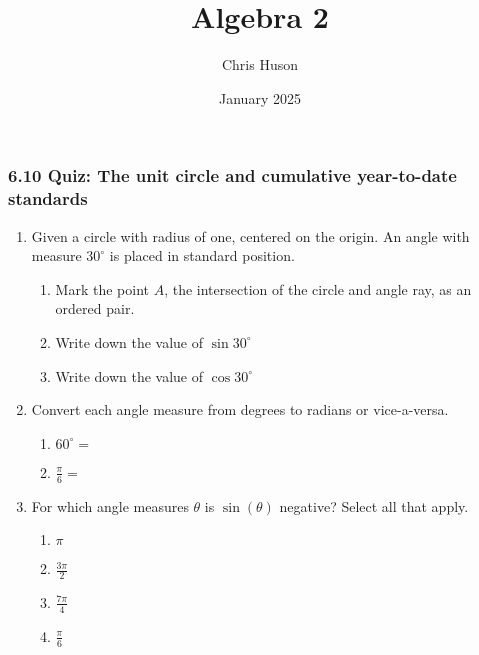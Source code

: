 \documentclass[12pt, twoside]{article}
\title{Algebra 2}
\author{Chris Huson}
\date{January 2025}
\begin{document}
\subsubsection*{6.10 Quiz: The unit circle and cumulative year-to-date standards}
\begin{enumerate}[itemsep=0.5cm]
    \item Given a circle with radius of one, centered on the origin. An angle with measure $30^\circ$ is placed in standard position. 
    \begin{multicols}{2}
        \begin{enumerate}
            \item Mark the point $A$, the intersection of the circle and angle ray, as an ordered pair.            
            \item Write down the value of $\sin{30^\circ}$ \vspace{1cm}
            \item  Write down the value of $\cos{30^\circ}$
      \end{enumerate}
        
    \begin{center}
    \end{center}
\end{multicols}

\item Convert each angle measure from degrees to radians or vice-a-versa.
    \begin{multicols}{2}
    \begin{enumerate}[itemsep=0.5cm]
        \item $60^\circ=$
        \item $\displaystyle \frac{\pi}{6}=$
    \end{enumerate}
    \end{multicols} \vspace{1cm}

\item For which angle measures $\theta$ is $\sin(\theta)$ negative? Select all that apply.
    \begin{multicols}{2}
    \begin{enumerate}[itemsep=0.5cm]
        \item $\pi$
        \item $\displaystyle \frac{3\pi}{2}$
        \item $\displaystyle \frac{7\pi}{4}$
        \item $\displaystyle \frac{\pi}{6}$
    \end{enumerate}
    \end{multicols} \vspace{1cm}


\end{enumerate}
\end{document}
